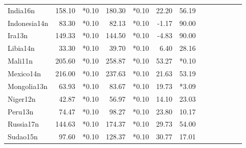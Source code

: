 \begin{landscape}
\begin{table}[htb]
\begin{tabular}{@{}l|rr|rr|rr|rr|rr|rr@{}}
India16n&158.10&*0.10&180.30&*0.10&22.20&56.19\\
Indonesia14n&83.30&*0.10&82.13&*0.10&-1.17&90.00\\
Ira13n&149.33&*0.10&144.50&*0.10&-4.83&90.00\\
Libia14n&33.30&*0.10&39.70&*0.10&6.40&28.16\\
Mali11n&205.60&*0.10&258.87&*0.10&53.27&*0.10\\
Mexico14n&216.00&*0.10&237.63&*0.10&21.63&53.19\\
Mongolia13n&63.93&*0.10&83.67&*0.10&19.73&*3.09\\
Niger12n&42.87&*0.10&56.97&*0.10&14.10&23.03\\
Peru13n&74.47&*0.10&98.27&*0.10&23.80&10.17\\
Russia17n&144.63&*0.10&174.37&*0.10&29.73&54.00\\
Sudao15n&97.60&*0.10&128.37&*0.10&30.77&17.01\\
\bottomrule
\end{tabular}
\end{table}
\end{landscape}
